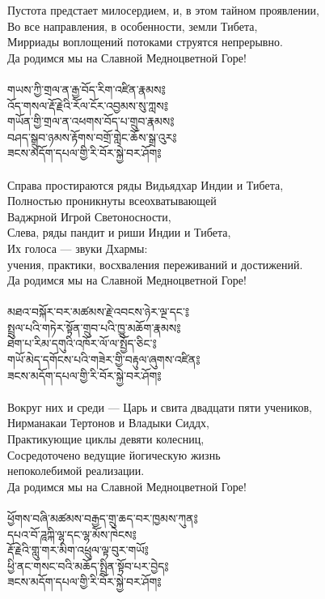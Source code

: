 Пустота предстает милосердием, и, в этом тайном проявлении,\\
Во все направления, в особенности, земли Тибета,\\
Мирриады воплощений потоками струятся непрерывно.\\
Да родимся мы на Славной Медноцветной Горе!\\
\\
\newpage
{\ti གཡས་ཀྱི་གྲལ་ན་རྒྱ་བོད་རིག་འཛིན་རྣམས༔\\
འོད་གསལ་རྡོ་རྗེའི་རོལ་ངོར་འབྱམས་སུ་ཀླས༔\\
གཡོན་གྱི་གྲལ་ན་འཕགས་བོད་པ་གྲུབ་རྣམས༔\\
བཤད་སྒྲུབ་ཉམས་རྟོགས་བགྲོ་གླེང་ཆོས་སྒྲ་འུར༔\\
ཟངས་མདོག་དཔལ་གྱི་རི་བོར་སྐྱེ་བར་ཤོག༔}\\
\\
\ru
Справа простираются ряды Видьядхар Индии и Тибета,\\
Полностью проникнуты всеохватывающей \\ \indent Ваджрной Игрой Светоносности,\\
Слева, ряды пандит и риши Индии и Тибета,\\
Их голоса — звуки Дхармы: \\ \indent учения, практики, восхваления переживаний и достижений.\\
Да родимся мы на Славной Медноцветной Горе!\\
\\
{\ti མཐའ་བསྐོར་བར་མཚམས་རྗེ་འབངས་ཉེར་ལྔ་དང་༔\\
སྤྲུལ་པའི་གཏེར་སྟོན་གྲུབ་པའི་ཁྱུ་མཆོག་རྣམས༔\\
ཐེག་པ་རིམ་དགུའི་འཁོར་ལོ་ལ་སྤྱོད་ཅིང་༔\\
གཡོ་མེད་དགོངས་པའི་གཟེར་གྱི་བརྟུལ་ཞུགས་འཛིན༔\\
ཟངས་མདོག་དཔལ་གྱི་རི་བོར་སྐྱེ་བར་ཤོག༔}\\
\\
\ru
Вокруг них и среди — Царь и свита двадцати пяти учеников,\\
Нирманакаи Тертонов и Владыки Сиддх,\\
Практикующие циклы девяти колесниц,\\
Сосредоточено ведущие йогическую жизнь \\ \indent непоколебимой реализации.\\
Да родимся мы на Славной Медноцветной Горе!\\
\\
\newpage
{\ti ཕྱོགས་བཞི་མཚམས་བརྒྱད་གྲུ་ཆད་བར་ཁྱམས་ཀུན༔\\
དཔའ་བོ་ཌཱཀྐི་ལྷ་དང་ལྷ་མོས་ཁེངས༔\\
རྡོ་རྗེའི་གླུ་གར་མིག་འཕྲུལ་ལྟ་བུར་གཡོ༔\\
ཕྱི་ནང་གསང་བའི་མཆོད་སྤྲིན་སྟོབ་པར་བྱེད༔\\
ཟངས་མདོག་དཔལ་གྱི་རི་བོར་སྐྱེ་བར་ཤོག༔}\\
